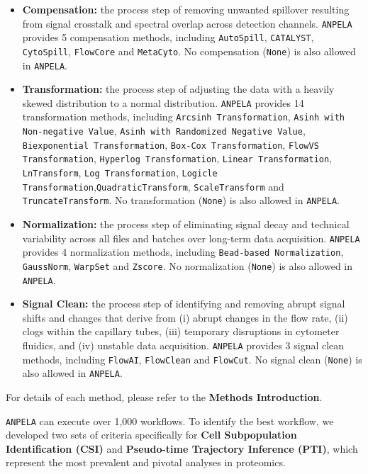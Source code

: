 \documentclass[]{article}
\providecommand{\tightlist}{%
  \setlength{\itemsep}{0pt}\setlength{\parskip}{0pt}}
\begin{document}
\begin{itemize}
\tightlist
\item
  \textbf{Compensation:} the process step of removing unwanted spillover resulting from signal crosstalk and spectral overlap across detection channels. \texttt{ANPELA} provides 5 compensation methods, including \texttt{AutoSpill}, \texttt{CATALYST}, \texttt{CytoSpill}, \texttt{FlowCore} and \texttt{MetaCyto}. No compensation (\texttt{None}) is also allowed in \texttt{ANPELA}.
\item
  \textbf{Transformation:} the process step of adjusting the data with a heavily skewed distribution to a normal distribution. \texttt{ANPELA} provides 14 transformation methods, including \texttt{Arcsinh Transformation}, \texttt{Asinh with Non-negative Value}, \texttt{Asinh with Randomized Negative Value}, \texttt{Biexponential Transformation}, \texttt{Box-Cox Transformation}, \texttt{FlowVS Transformation}, \texttt{Hyperlog Transformation}, \texttt{Linear Transformation}, \texttt{LnTransform}, \texttt{Log Transformation}, \texttt{Logicle Transformation},\texttt{QuadraticTransform}, \texttt{ScaleTransform} and \texttt{TruncateTransform}. No transformation (\texttt{None}) is also allowed in \texttt{ANPELA}.
\item
  \textbf{Normalization:} the process step of eliminating signal decay and technical variability across all files and batches over long-term data acquisition. \texttt{ANPELA} provides 4 normalization methods, including \texttt{Bead-based Normalization}, \texttt{GaussNorm}, \texttt{WarpSet} and \texttt{Zscore}. No normalization (\texttt{None}) is also allowed in \texttt{ANPELA}.
\item
  \textbf{Signal Clean:} the process step of identifying and removing abrupt signal shifts and changes that derive from (i) abrupt changes in the flow rate, (ii) clogs within the capillary tubes, (iii) temporary disruptions in cytometer fluidics, and (iv) unstable data acquisition. \texttt{ANPELA} provides 3 signal clean methods, including \texttt{FlowAI}, \texttt{FlowClean} and \texttt{FlowCut}. No signal clean (\texttt{None}) is also allowed in \texttt{ANPELA}.
\end{itemize}

For details of each method, please refer to the \textbf{Methods Introduction}.

\texttt{ANPELA} can execute over 1,000 workflows. To identify the best workflow, we developed two sets of criteria specifically for \textbf{Cell Subpopulation Identification (CSI)} and \textbf{Pseudo-time Trajectory Inference (PTI)}, which represent the most prevalent and pivotal analyses in proteomics.
\end{document}
